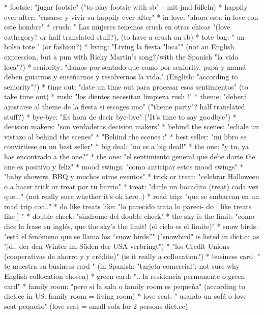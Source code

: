 \begin{itemize}
    * footsie: "jugar footsie" ("to play footsie with sb" -- mit jmd füßeln)
    * happily ever after: "casarse y vivir su happily ever after"
    * in love: "ahora esta in love con este hombre"
    * crush: " Las mujeres tenemos crush en otras chicas "(love cathegory? or half translated stuff?), (to have a crush on sb)
    * tote bag: " un bolso tote " (or fashion?)
    * living: "Living la fiesta "loca"" (not an English expression, but a pun with Ricky Martin's song?/with the Spanish "la vida loca"?)
    * seniority: "damos por sentado que como por seniority, papá y mamá deben guiarnos y enseñarnos y resolvernos la vida."  (English: "according to seniority"?)
    * time out: "date un time out para procesar esos sentimientos"  (to take time out)
    * rush: "los dientes necesitan limpieza rush !"
    * theme: "deberá ajustarse al theme de la fiesta si escoges uno" ("theme party"? half translated stuff?)
    * bye-bye: "Es hora de decir bye-bye" ("It's time to say goodbye")
    * decision makers: "son verdaderas decision makers"
    * behind the scenes: "echale un vistazo al behind the scenes"
    * "Behind the scenes :"
    * best seller: "mi libro se convirtiese en un best seller"
    * big deal: "no es a big deal!"
    * the one: "y tu, ya has encontrado a the one?"
    * the one: "el sentimiento general que debe darte the one es positivo y feliz"
    * mood swings: "como anticipar estos mood swings"
    * "baby showers, BBQ y muchos otros eventos"
    * trick or treat: "celebrar Halloween o a hacer trick or treat por tu barrio"
    * treat: "darle un bocadito (treat) cada vez que..." (not really sure whether it's ok here..)
    * road trip: "que se embarcan en un road trip con.."
    * do like treats like: "lo parecido trata lo pareci- do [ like treats like ] "
    * double check: "sindrome del double check"
    * the sky is the limit: "como dice la frase en inglés, que the sky's the limit! (el cielo es el limite)"
    * snow birds: "está el fenómeno que se llama los “snow birds”" ("snowbird" is listed in dict.cc as "jd., der den Winter im Süden der USA verbringt")
    * "los Credit Unions (cooperativas de ahorro y y crédito)" (is it really a collocation?)
    * business card: " te muestra su business card " (in Spanish: "tarjeta comercial"; not sure why English collocation chosen)
    * green card: ".. la residencia permanente o green card"
    * family room: "pero si la sala o family room es pequeña" (according to dict.cc in US: family room = living room)
    * love seat: " usando un sofá o love seat pequeño"  (love seat = small sofa for 2 persons dict.cc)

\end{itemize}

